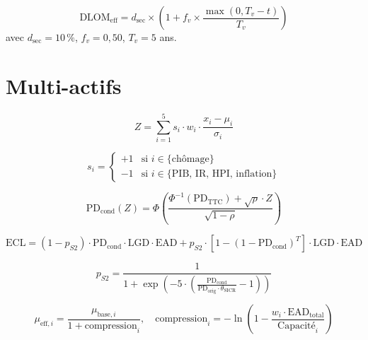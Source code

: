 \documentclass[10pt, a4paper, oneside]{report}
\theoremstyle{definition}
\begin{document}
\begin{equation}
\text{DLOM}_{\text{eff}} = d_{\text{sec}} \times \left(1 + f_v \times \frac{\max(0, T_v - t)}{T_v}\right)
\label{eq:dlom}
\end{equation}
avec $d_{\text{sec}} = 10\,\%$, $f_v = 0{,}50$, $T_v = 5$ ans.


\section{Multi-actifs}
\label{sec:annexe:multi}

\begin{equation}
Z = \sum_{i=1}^{5} s_i \cdot w_i \cdot \frac{x_i - \mu_i}{\sigma_i}
\label{eq:macro-to-z}
\end{equation}

\begin{equation}
s_i = \begin{cases} +1 & \text{si } i \in \{\text{chômage}\} \\ -1 & \text{si } i \in \{\text{PIB, IR, HPI, inflation}\} \end{cases}
\label{eq:signe-z}
\end{equation}

\begin{equation}
\text{PD}_{\text{cond}}(Z) = \Phi\!\left(\frac{\Phi^{-1}(\text{PD}_{\text{TTC}}) + \sqrt{\rho} \cdot Z}{\sqrt{1 - \rho}}\right)
\label{eq:vasicek-multi}
\end{equation}

\begin{equation}
\text{ECL} = (1 - p_{S2}) \cdot \text{PD}_{\text{cond}} \cdot \text{LGD} \cdot \text{EAD} + p_{S2} \cdot [1-(1-\text{PD}_{\text{cond}})^T] \cdot \text{LGD} \cdot \text{EAD}
\label{eq:ecl-staging-multi}
\end{equation}

\begin{equation}
p_{S2} = \frac{1}{1 + \exp\!\left(-5 \cdot \left(\frac{\text{PD}_{\text{cond}}}{\text{PD}_{\text{orig}} \cdot \theta_{\text{SICR}}} - 1\right)\right)}
\label{eq:transition-staging}
\end{equation}

\begin{equation}
\mu_{\text{eff},i} = \frac{\mu_{\text{base},i}}{1 + \text{compression}_i}, \quad \text{compression}_i = -\ln\!\left(1 - \frac{w_i \cdot \text{EAD}_{\text{total}}}{\text{Capacité}_i}\right)
\label{eq:spread-compression}
\end{equation}
\end{document}
